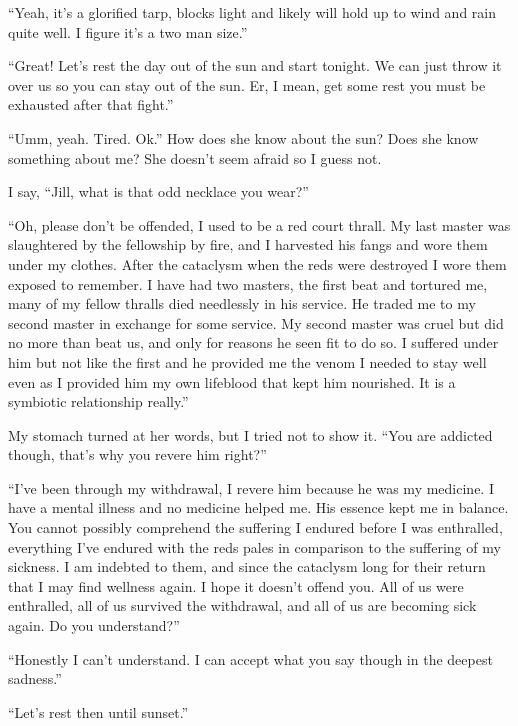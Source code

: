 ``Yeah, it's a glorified tarp, blocks light and likely will hold up to wind and rain quite well. I figure it's a two man size.''

``Great! Let's rest the day out of the sun and start tonight. We can just throw it over us so you can stay out of the sun. Er, I mean, get some rest you must be exhausted after that fight.''

``Umm, yeah. Tired. Ok.'' How does she know about the sun? Does she know something about me? She doesn't seem afraid so I guess not.

I say, ``Jill, what is that odd necklace you wear?''

``Oh, please don't be offended, I used to be a red court thrall. My last master was slaughtered by the fellowship by fire, and I harvested his fangs and wore them under my clothes. After the cataclysm when the reds were destroyed I wore them exposed to remember. I have had two masters, the first beat and tortured me, many of my fellow thralls died needlessly in his service. He traded me to my second master in exchange for some service. My second master was cruel but did no more than beat us, and only for reasons he seen fit to do so. I suffered under him but not like the first and he provided me the venom I needed to stay well even as I provided him my own lifeblood that kept him nourished. It is a symbiotic relationship really.''

My stomach turned at her words, but I tried not to show it. ``You are addicted though, that's why you revere him right?''

``I've been through my withdrawal, I revere him because he was my medicine. I have a mental illness and no medicine helped me. His essence kept me in balance. You cannot possibly comprehend the suffering I endured before I was enthralled, everything I've endured with the reds pales in comparison to the suffering of my sickness. I am indebted to them, and since the cataclysm long for their return that I may find wellness again. I hope it doesn't offend you. All of us were enthralled, all of us survived the withdrawal, and all of us are becoming sick again. Do you understand?''

``Honestly I can't understand. I can accept what you say though in the deepest sadness.''

``Let's rest then until sunset.''


